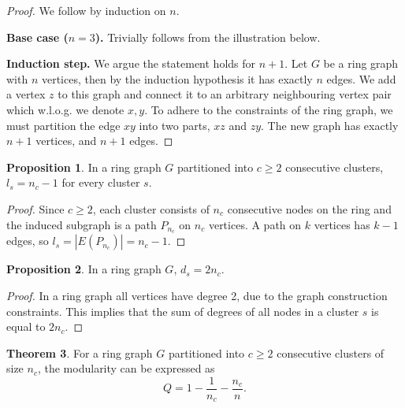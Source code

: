 \documentclass[12pt]{article}
\theoremstyle{definition}
\newtheorem{theorem}{Theorem}
\newtheorem{proposition}[theorem]{Proposition}
\begin{document}
\begin{proof}
  We follow by induction on $n$.

  \noindent
  \textbf{Base case ($n = 3$).} Trivially follows from the illustration below.
  \begin{center}
  \end{center}

  \noindent
  \textbf{Induction step.} We argue the statement holds for $n + 1$. Let $G$ be a ring graph with $n$ vertices, then by the induction hypothesis it has exactly $n$ edges. We add a vertex $z$ to this graph and connect it to an arbitrary neighbouring vertex pair which w.l.o.g. we denote $x,y$. To adhere to the constraints of the ring graph, we must partition the edge $xy$ into two parts, $xz$ and $zy$. The new graph has exactly $n + 1$ vertices, and $n + 1$ edges.
\end{proof}

\begin{proposition}
  \label{prop:3.2}
  In a ring graph $G$ partitioned into $c \geq 2$ consecutive clusters, $l_s = n_c - 1$ for every cluster $s$.
\end{proposition}

\begin{proof}
  Since $c \geq 2$, each cluster consists of $n_c$ consecutive nodes on the ring and the induced subgraph is a path $P_{n_c}$ on $n_c$ vertices. A path on $k$ vertices has $k-1$ edges, so $l_s = |E(P_{n_c})| = n_c - 1$.
\end{proof}

\begin{proposition}
  \label{prop:3.3}
  In a ring graph $G$, $d_s = 2n_c$.
\end{proposition}

\begin{proof}
  In a ring graph all vertices have degree 2, due to the graph construction constraints. This implies that the sum of degrees of all nodes in a cluster $s$ is equal to $2n_c$.
\end{proof}

\newpage
\begin{theorem}
  For a ring graph $G$ partitioned into $c \geq 2$ consecutive clusters of size $n_c$, the modularity can be expressed as
  \[
    Q = 1 - \frac{1}{n_c} - \frac{n_c}{n}.
  \]
\end{theorem}
\end{document}
